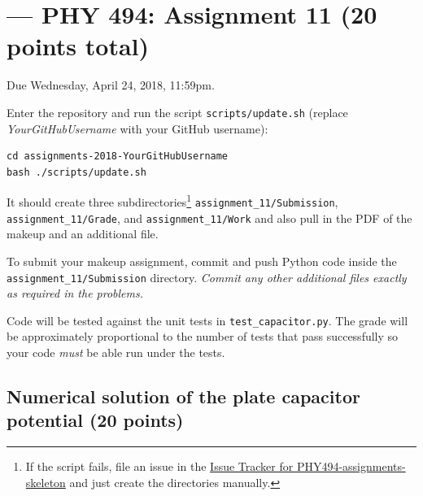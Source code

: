 \documentclass[letterpaper]{scrartcl}
\newcommand{\anumber}{11}
\newcommand{\anum}{\anumber}
\begin{document}

\setcounter{section}{\anumber}
\addtocounter{section}{-1}
\section{ --- PHY 494:  Assignment \anumber{} (20 points total)}

\noindent Due Wednesday, April 24, 2018, 11:59pm.

\noindent
{}

Enter the repository and run the script
\texttt{scripts/update.sh} (replace \emph{YourGitHubUsername} with
your GitHub username):
\begin{verbatim}
cd assignments-2018-YourGitHubUsername
bash ./scripts/update.sh 
\end{verbatim} 
It should create three subdirectories\footnote{If the script fails,
  file an issue in the
  \href{https://github.com/ASU-CompMethodsPhysics-PHY494/PHY494-assignments-skeleton/issues}{Issue
    Tracker for PHY494-assignments-skeleton} and just create the
  directories manually.} \texttt{assignment\_\anum{}/Submission},
\texttt{assignment\_\anum{}/Grade}, and
\texttt{assignment\_\anum{}/Work} and also pull in the PDF of the
makeup and an additional file.

To submit your makeup assignment, commit and push Python code inside
the \texttt{assignment\_\anum{}/Submission} directory. \emph{Commit
  any other additional files exactly as required in the problems.}

Code will be tested against the unit tests in
\texttt{test\_capacitor.py}. The grade will be approximately
proportional to the number of tests that pass successfully so your
code \emph{must} be able run under the tests.



\subsection{Numerical solution of the plate capacitor potential (20 points)}
\label{sec:capacitor}
\end{document}
